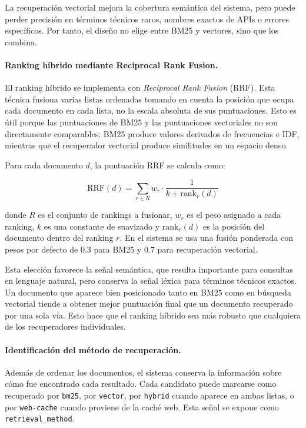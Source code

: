 \documentclass[11pt]{article}
\begin{document}
La recuperación vectorial mejora la cobertura semántica del sistema, pero puede perder precisión
en términos técnicos raros, nombres exactos de APIs o errores específicos. Por tanto, el diseño no
elige entre BM25 y vectores, sino que los combina.

\paragraph{Ranking híbrido mediante Reciprocal Rank Fusion.}
El ranking híbrido se implementa con \emph{Reciprocal Rank Fusion} (RRF). Esta técnica fusiona
varias listas ordenadas tomando en cuenta la posición que ocupa cada documento en cada lista, no
la escala absoluta de sus puntuaciones. Esto es útil porque las puntuaciones de BM25 y las
puntuaciones vectoriales no son directamente comparables: BM25 produce valores derivados de
frecuencias e IDF, mientras que el recuperador vectorial produce similitudes en un espacio denso.

Para cada documento \(d\), la puntuación RRF se calcula como:

\[
\mathrm{RRF}(d) =
\sum_{r \in R}
w_r \cdot \frac{1}{k + \mathrm{rank}_r(d)}
\]

donde \(R\) es el conjunto de rankings a fusionar, \(w_r\) es el peso asignado a cada ranking,
\(k\) es una constante de suavizado y \(\mathrm{rank}_r(d)\) es la posición del documento dentro
del ranking \(r\). En el sistema se usa una fusión ponderada con pesos por defecto de \(0.3\)
para BM25 y \(0.7\) para recuperación vectorial.

Esta elección favorece la señal semántica, que resulta importante para consultas en lenguaje
natural, pero conserva la señal léxica para términos técnicos exactos. Un documento que aparece
bien posicionado tanto en BM25 como en búsqueda vectorial tiende a obtener mejor puntuación final
que un documento recuperado por una sola vía. Esto hace que el ranking híbrido sea más robusto
que cualquiera de los recuperadores individuales.

\paragraph{Identificación del método de recuperación.}
Además de ordenar los documentos, el sistema conserva la información sobre cómo fue encontrado
cada resultado. Cada candidato puede marcarse como recuperado por \texttt{bm25}, por
\texttt{vector}, por \texttt{hybrid} cuando aparece en ambas listas, o por \texttt{web-cache}
cuando proviene de la caché web. Esta señal se expone como \texttt{retrieval\_method}.
\end{document}
